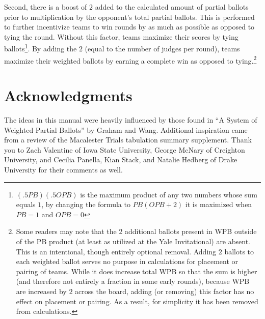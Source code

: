 \documentclass{article}
\begin{document}
Second, there is a boost of $2$ added to the calculated amount of partial ballots prior to multiplication by the opponent's total partial ballots.  This is performed to further incentivize teams to win rounds by as much as possible as opposed to tying the round.  Without this factor, teams maximize their scores by tying ballots\footnote{$\left(.5PB\right)\left(.5OPB\right)$ is the maximum product of any two numbers whose sum equals $1$, by changing the formula to $PB\left(OPB+2\right)$ it is maximized when $PB=1$ and $OPB=0$}.  By adding the $2$ (equal to the number of judges per round), teams maximize their weighted ballots by earning a complete win as opposed to tying.\footnote{Some readers may note that the 2 additional ballots present in WPB outside of the PB product (at least as utilized at the Yale Invitational) are absent.  This is an intentional, though entirely optional removal.  Adding $2$ ballots to each weighted ballot serves no purpose in calculations for placement or pairing of teams.  While it does increase total WPB so that the sum is higher (and therefore not entirely a fraction in some early rounds), because WPB are increased by $2$ across the board, adding (or removing) this factor has no effect on placement or pairing.  As a result, for simplicity it has been removed from calculations.}

\section{Acknowledgments}
The ideas in this manual were heavily influenced by those found in ``A System of Weighted Partial Ballots'' by Graham and Wang.  Additional inspiration came from a review of the Macalester Trials tabulation summary supplement.  Thank you to Zach Valentine of Iowa State University, George McNary of Creighton University, and Cecilia Panella, Kian Stack, and Natalie Hedberg of Drake University for their comments as well.
\end{document}
